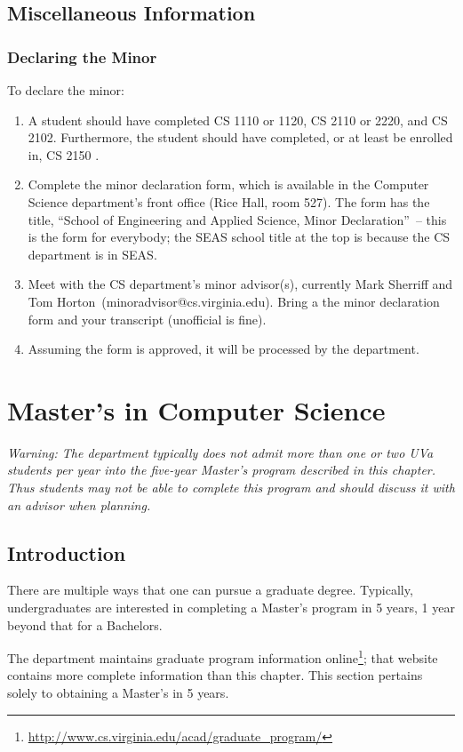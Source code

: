 \documentclass[10pt,letter]{book}
\makeatletter
\newenvironment{numlist}{
\begin{enumerate}
\setlength{\itemsep}{0pt}
\setlength{\parskip}{0pt}}
{\end{enumerate}}
\newcommand{\csminoradvisor}{Mark Sherriff and Tom Horton}
\newcommand{\csminoradvisoremail}{minoradvisor@cs.virginia.edu}
\newcommand{\mychapter}[2]{\chapter{#1}\renewcommand{\leftmark}{\textsc{#2}}}
\newcommand{\mysection}[1]{\section{#1}\renewcommand{\rightmark}{#1}}
\newcommand{\myurl}[1]{\footnote{\scriptsize\url{#1}}}
\makeatother
\begin{document}
 
\mysection{Miscellaneous Information}
\subsection{Declaring the Minor}

To declare the minor:

\begin{numlist}

\item A student should have completed CS 1110 or 1120, CS
  2110 or 2220, and CS 2102. Furthermore, the
  student should have completed, or at least be enrolled in, CS 2150
 .

\item Complete the minor declaration form, which is available in the
  Computer Science department's front office (Rice Hall, room 527).
  The form has the title, ``School of Engineering and Applied Science,
  Minor Declaration''~-- this is the form for everybody; the SEAS
  school title at the top is because the CS department is in SEAS.

\item Meet with the CS department's minor advisor(s), currently
  \csminoradvisor\ (\csminoradvisoremail).  Bring a the minor
  declaration form and your transcript (unofficial is fine).

\item Assuming the form is approved, it will be processed by the
  department.

\end{numlist}


\clearpage
\mychapter{Master's in Computer Science}{Masters in CS}


{\Large\em Warning: The department typically does not admit more than
  one or two UVa students per year into the five-year Master's program
  described in this chapter. Thus students may not be able to complete
  this program and should discuss it with an advisor when planning.}

\mysection{Introduction}

There are multiple ways that one can pursue a graduate degree.
Typically, undergraduates are interested in completing a Master's
program in 5 years, 1 year beyond that for a Bachelors.

The department maintains graduate program information
online\myurl{http://www.cs.virginia.edu/acad/graduate_program/};
that website contains more complete information than this chapter.
This section pertains solely to obtaining a Master's in 5 years.
\end{document}
